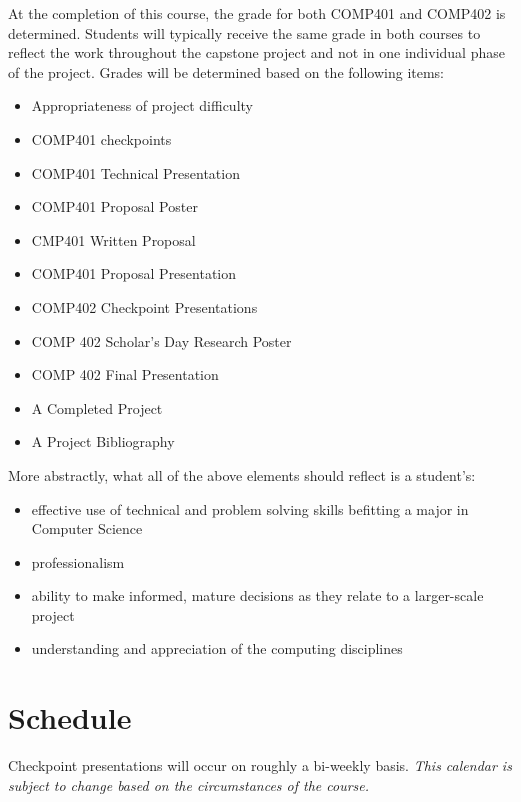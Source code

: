 \documentclass[nobib]{tufte-handout}
\begin{document}
At the completion of this course, the grade for both COMP401 and COMP402 is determined. Students will typically receive the same grade in both courses to reflect the work throughout the capstone project and not in one individual phase of the project. Grades will be determined based on the following items:
\begin{itemize}
\item Appropriateness of project difficulty
\item COMP401 checkpoints
\item COMP401 Technical Presentation
\item COMP401 Proposal Poster
\item CMP401 Written Proposal
\item COMP401 Proposal Presentation
\item COMP402 Checkpoint Presentations
\item COMP 402 Scholar's Day Research Poster
\item COMP 402 Final Presentation
\item A Completed Project
\item A Project Bibliography
\end{itemize}

More abstractly, what all of the above elements should reflect is a student's:
\begin{itemize}
\item effective use of technical and problem solving skills befitting a major in Computer Science
\item professionalism
\item ability to make informed, mature decisions as they relate to a larger-scale project
\item understanding and appreciation of the computing disciplines
\end{itemize}

\section{Schedule}

Checkpoint presentations will occur on roughly a bi-weekly basis.  \textit{This calendar is subject to change based on the circumstances of the course.}
\end{document}
